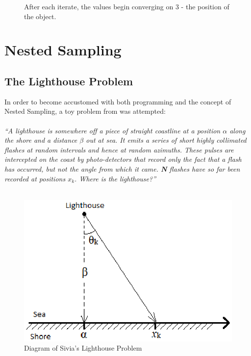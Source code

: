 \documentclass[a4paper,12pt]{article}
\begin{document}
\begin{figure}[!h]
\begin{center}
  \caption{After each iterate, the values begin converging on 3 - the position of the object.}
 \end{center}
\end{figure}




\section{Nested Sampling}
\subsection{The Lighthouse Problem}
In order to become accustomed with both programming and the concept of Nested Sampling, a toy problem from \cite{sivia} was attempted: \\ \\
\textit{``A lighthouse is somewhere off a piece of straight coastline at a position $\alpha$ along the shore and a distance $\beta$ out at sea. It emits a series of short highly collimated flashes at random intervals and hence at random azimuths. These pulses are intercepted on the coast by photo-detectors that record only the fact that a flash has occurred, but not the angle from which it came. \textbf{N} flashes have so far been recorded at positions $x_{k}$. Where is the lighthouse?''}\cite{sivia}
\\ \\



\begin{figure}[!h]
 \begin{center}
  \includegraphics[scale=0.75]{lighthouse.eps}
  \caption{Diagram of Sivia's Lighthouse Problem \cite{sivia}}
 \end{center}
\end{figure}
\end{document}
